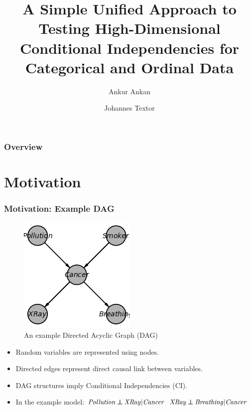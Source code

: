 \documentclass{beamer}
\def\ci{\perp\!\!\!\!\!\perp}
\begin{document}
\title{A Simple Unified Approach to Testing High-Dimensional Conditional
Independencies for Categorical and Ordinal Data}
\author {Ankur Ankan \and Johannes Textor}
\date{}
\maketitle

\begin{frame}
	\frametitle{Overview}
	\tableofcontents
\end{frame}

\section{Motivation}
\begin{frame}
	\frametitle{Motivation: Example DAG}
	\begin{figure}
		\centering
		\includegraphics[scale=0.6]{imgs/example_dag.png}
		\caption*{An example Directed Acyclic Graph (DAG)}
	\end{figure}
	\begin{itemize}
		\setlength\itemsep{1em}
		\item Random variables are represented using nodes.
		\item Directed edges represent direct causal link between variables.
		\item DAG structures imply Conditional Independencies (CI).
		\item In the example model: \newline
			\hspace*{20pt} $ \text{\emph{Pollution}} \ci \text{\emph{XRay}} | \text{\emph{Cancer}} $ \newline
			\hspace*{20pt} $ \text{\emph{XRay}} \ci \text{\emph{Breathing}} | \text{\emph{Cancer}} $
	\end{itemize}
\end{frame}
\end{document}
